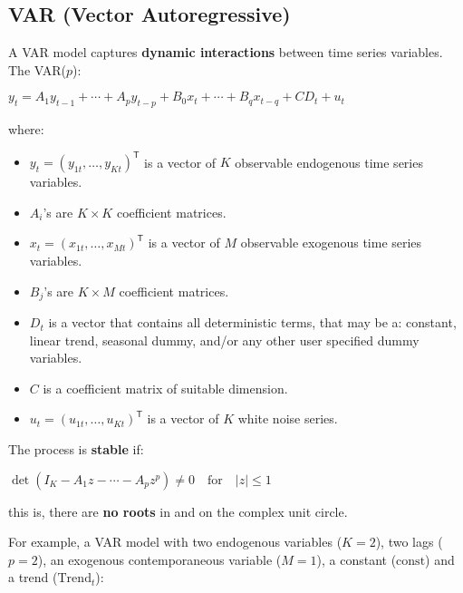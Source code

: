 \documentclass[10pt, a4paper, landscape]{extarticle}
\newcommand{\tr}{\mathsf{T}}
\begin{document}
\begin{multicols}{2}

\section*{VAR (Vector Autoregressive)}

A VAR model captures \textbf{dynamic interactions} between time series variables. The VAR($p$):

\begin{center}
	$y_t = A_1 y_{t - 1} + \cdots + A_p y_{t - p} + B_0 x_t + \cdots + B_q x_{t - q} + CD_t + u_t$
\end{center}

where:

\begin{itemize}[leftmargin=*]
	\item $y_t = (y_{1t}, \ldots, y_{Kt})^\tr$ is a vector of $K$ observable endogenous time series variables.
	\item $A_i$'s are $K \times K$ coefficient matrices.
	\item $x_t = (x_{1t}, \ldots, x_{Mt})^\tr$ is a vector of $M$ observable exogenous time series variables.
	\item $B_j$'s are $K \times M$ coefficient matrices.
	\item $D_t$ is a vector that contains all deterministic terms, that may be a: constant, linear trend, seasonal dummy, and/or any other user specified dummy variables.
	\item $C$ is a coefficient matrix of suitable dimension.
	\item $u_t = (u_{1t}, \ldots, u_{Kt})^\tr$ is a vector of $K$ white noise series.
\end{itemize}

The process is \textbf{stable} if:

\begin{center}
	$\det(I_K - A_1 z - \cdots - A_p z^p) \neq 0 \quad \mathrm{for} \quad \lvert z \rvert \leq 1$
\end{center}

\quad this is, there are \textbf{no roots} in and on the complex unit circle.

For example, a VAR model with two endogenous variables ($K=2$), two lags ($p=2$), an exogenous contemporaneous variable ($M=1$), a constant ($\mathrm{const}$) and a trend ($\mathrm{Trend}_t$):


\end{multicols}
\end{document}

